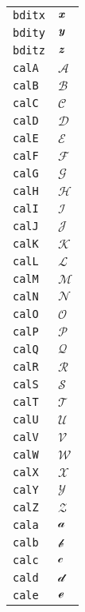 \begin{longtable}{ll}
\texttt{bditx}&${}{\textbf{\textit{x}}}{}$\\
\texttt{bdity}&${}{\textbf{\textit{y}}}{}$\\
\texttt{bditz}&${}{\textbf{\textit{z}}}{}$\\
\texttt{calA}&${}{\mathcal{A}}{}$\\
\texttt{calB}&${}{\mathcal{B}}{}$\\
\texttt{calC}&${}{\mathcal{C}}{}$\\
\texttt{calD}&${}{\mathcal{D}}{}$\\
\texttt{calE}&${}{\mathcal{E}}{}$\\
\texttt{calF}&${}{\mathcal{F}}{}$\\
\texttt{calG}&${}{\mathcal{G}}{}$\\
\texttt{calH}&${}{\mathcal{H}}{}$\\
\texttt{calI}&${}{\mathcal{I}}{}$\\
\texttt{calJ}&${}{\mathcal{J}}{}$\\
\texttt{calK}&${}{\mathcal{K}}{}$\\
\texttt{calL}&${}{\mathcal{L}}{}$\\
\texttt{calM}&${}{\mathcal{M}}{}$\\
\texttt{calN}&${}{\mathcal{N}}{}$\\
\texttt{calO}&${}{\mathcal{O}}{}$\\
\texttt{calP}&${}{\mathcal{P}}{}$\\
\texttt{calQ}&${}{\mathcal{Q}}{}$\\
\texttt{calR}&${}{\mathcal{R}}{}$\\
\texttt{calS}&${}{\mathcal{S}}{}$\\
\texttt{calT}&${}{\mathcal{T}}{}$\\
\texttt{calU}&${}{\mathcal{U}}{}$\\
\texttt{calV}&${}{\mathcal{V}}{}$\\
\texttt{calW}&${}{\mathcal{W}}{}$\\
\texttt{calX}&${}{\mathcal{X}}{}$\\
\texttt{calY}&${}{\mathcal{Y}}{}$\\
\texttt{calZ}&${}{\mathcal{Z}}{}$\\
\texttt{cala}&${}{\mathcal{a}}{}$\\
\texttt{calb}&${}{\mathcal{b}}{}$\\
\texttt{calc}&${}{\mathcal{c}}{}$\\
\texttt{cald}&${}{\mathcal{d}}{}$\\
\texttt{cale}&${}{\mathcal{e}}{}$\\

\end{longtable}
